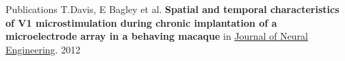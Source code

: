 \documentclass{resume} %
\begin{document}

\begin{rSection}{Publications}
  T.Davis, E Bagley et al. {\bf Spatial and temporal characteristics of V1 microstimulation during chronic implantation of a microelectrode array in a behaving macaque} in \href{https://www.ncbi.nlm.nih.gov/pmc/articles/PMC3521049/}{Journal of Neural Engineering}. 2012 \\
\end{rSection}
\end{document}
